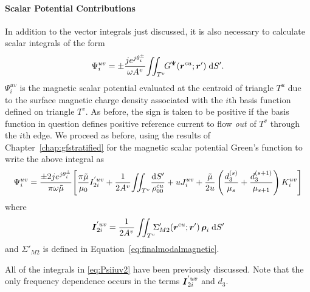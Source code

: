 \paragraph{Scalar Potential Contributions}
In addition to the vector integrals just discussed, it is also 
necessary to calculate scalar integrals of the form
\begin{equation}
  \Psi_i^{uv} = \pm \frac{je^{j\theta^{\pm}_i}}{\omega A^v} \!
  \iint_{T^v} \!\!
  {G}^{\Psi}(\boldsymbol{r}^{cu};\boldsymbol{r}') \; \text{d} S'.  \label{eq:Psiiuv}
\end{equation}
$\Psi_i^{uv}$ is the 
magnetic scalar potential evaluated at the centroid of
triangle $T^u$ due to the surface magnetic charge density associated with
the $i$th basis function defined on triangle $T^v$.  As before, the
sign is taken to be positive if the basis function in question defines
positive reference current to flow {\em out} of $T^v$ through the 
$i$th edge. 
We proceed as before, using the results of Chapter~\ref{chap:gfstratified} for the
magnetic scalar potential Green's function to write the above integral
as 
\begin{equation}
  \Psi_i^{uv} = \frac{\pm 2 j e^{j\theta^{\pm}_i}}{\pi\omega\tilde{\mu}} 
  \Biggl[
  \frac{\pi\tilde{\mu}}{\mu_0}  
  I_{2i}^{'uv} + 
  \frac{1}{2A^v}  \! \iint_{T^v}  \!
      \frac{\text{d} S'}{\rho^{\text{c}u}_{00}} +
      u J_i^{uv} +
      \frac{\tilde{\mu}}{2u} 
      \left(
        \frac{d_3^{(s)}}{\mu_s} + \frac{d_3^{(s+1)}}{\mu_{s+1}}
      \right)
      K_i^{uv}
    \Biggr] \label{eq:Psiiuv2}
 \end{equation}
where
\begin{equation}
     \boldsymbol{I}_{2i}^{'uv} =
     \frac{1}{2A^v}  \iint_{T^v}  \!\!\!
     \Sigma'_{M2}(\boldsymbol{r}^{\text{c}u};\boldsymbol{r}')
     \, \boldsymbol{\rho}_i \; \text{d} S' 
\end{equation}
and $\Sigma'_{M2}$ is defined in Equation~\eqref{eq:finalmodalmagnetic}.

All of the integrals in \eqref{eq:Psiiuv2} have been previously
discussed.  Note that the only frequency dependence occurs in the
terms $\boldsymbol{I}_{2i}^{'uv}$ and $d_3$. 

  
